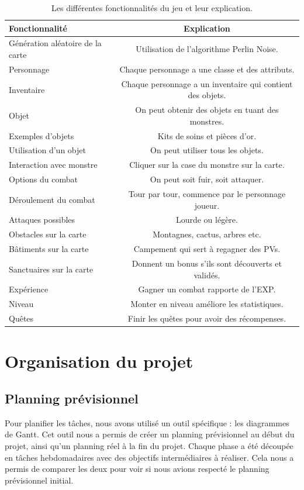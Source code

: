 \documentclass[11pt,a4paper]{article}
\begin{document}
\begin{table}[H]
\begin{tabular}{|l|c|}
\hline
Fonctionnalité & Explication \\
\hline
Génération aléatoire de la carte & Utilisation de l'algorithme Perlin Noise. \\
Personnage & Chaque personnage a une classe et des attributs. \\
Inventaire & Chaque personnage a un inventaire qui contient des objets. \\
Objet & On peut obtenir des objets en tuant des monstres. \\
Exemples d'objets & Kits de soins et pièces d'or. \\
Utilisation d'un objet & On peut utiliser tous les objets. \\
Interaction avec monstre & Cliquer sur la case du monstre sur la carte. \\
Options du combat & On peut soit fuir, soit attaquer. \\
Déroulement du combat & Tour par tour, commence par le personnage joueur. \\
Attaques possibles & Lourde ou légère. \\
Obstacles sur la carte & Montagnes, cactus, arbres etc. \\
Bâtiments sur la carte & Campement qui sert à regagner des PVs. \\
Sanctuaires sur la carte & Donnent un bonus s'ils sont découverts et validés. \\
Expérience & Gagner un combat rapporte de l'EXP. \\
Niveau & Monter en niveau améliore les statistiques. \\
Quêtes & Finir les quêtes pour avoir des récompenses. \\
\hline
\end{tabular}
\label{tab_taches}
\caption{Les différentes fonctionnalités du jeu et leur explication.}
\end{table}

\section{Organisation du projet}

\subsection{Planning prévisionnel}

Pour planifier les tâches, nous avons utilisé un outil spécifique : les diagrammes de Gantt.
Cet outil nous a permis de créer un planning prévisionnel au début du projet, ainsi qu'un planning réel à la fin du projet.
Chaque phase a été découpée en tâches hebdomadaires avec des objectifs intermédiaires à réaliser.
Cela nous a permis de comparer les deux pour voir si nous avions respecté le planning prévisionnel initial.
\end{document}
